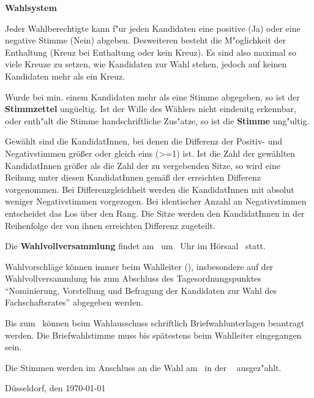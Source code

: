 \textbf{Wahlsystem}

Jeder Wahlberechtigte kann f"ur jeden Kandidaten eine positive (Ja) oder eine negative Stimme (Nein) abgeben. Desweiteren besteht die M"oglichkeit der Enthaltung (Kreuz bei Enthaltung oder kein Kreuz). Es sind also maximal so viele Kreuze zu setzen, wie Kandidaten zur Wahl stehen, jedoch auf keinen Kandidaten mehr als ein Kreuz.

Wurde bei min. einem Kandidaten mehr als eine Stimme abgegeben, so ist der \textbf{Stimmzettel} ung\"ueltig. Ist der Wille des W\"ahlers nicht eindeuitg erkennbar, oder enth"alt die Stimme handschriftliche Zus"atze, so ist die \textbf{Stimme} ung"ultig.

Gewählt sind die KandidatInnen, bei denen die Differenz der Positiv- und Negativstimmen größer oder gleich eins (>=1) ist. 
Ist die Zahl der gewählten KandidatInnen größer als die Zahl der zu vergebenden Sitze, so wird eine Reihung unter diesen KandidatInnen gemäß der erreichten Differenz vorgenommen. 
Bei Differenzgleichheit werden die KandidatInnen mit absolut weniger Negativstimmen vorgezogen. Bei identischer Anzahl an Negativstimmen entscheidet das Los über den Rang. 
Die Sitze werden den KandidatInnen in der Reihenfolge der von ihnen erreichten Differenz zugeteilt.


Die \textbf{Wahlvollversammlung} findet am \wahlvvDatum ~um \wahlvvUhr ~Uhr im Hörsaal \wahlvvSaal ~statt.

Wahlvorschläge können immer beim Wahlleiter (\wahlleiter ), insbesondere auf der Wahlvollversammlung bis zum Abschluss des Tagesordnungspunktes ``Nominierung, Vorstellung und Befragung der Kandidaten zur Wahl des Fachschaftsrates'' abgegeben werden. 

Bis zum \briefwahlAntrag ~können beim Wahlausschuss schriftlich Briefwahlunterlagen beantragt werden. Die Briefwahl\-stimme muss bis spätestens \briefwahlEnde beim Wahlleiter eingegangen sein.

Die Stimmen werden im Anschluss an die Wahl am \auszaehlung ~in der ~\buero \phantom{.} ausgez"ahlt.


Düsseldorf, den \today

\vspace{2\baselineskip}

\wahlleiter

